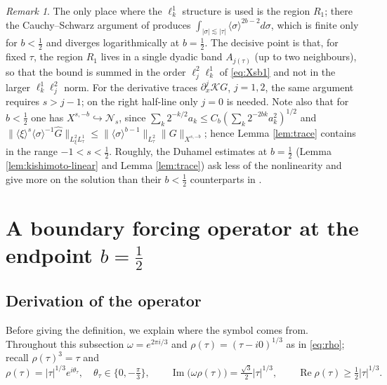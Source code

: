 \documentclass[10pt,reqno]{amsart}
\newcommand{\new}[1]{#1}
\theoremstyle{remark}
\newtheorem{remark}[theorem]{Remark}
\numberwithin{equation}{section}
\newcommand{\om}{\omega}
\newcommand{\pd}{\partial}
\newcommand{\re}{\operatorname{Re}}
\newcommand{\ima}{\operatorname{Im}}
\newcommand{\lan}{\langle}
\newcommand{\ran}{\rangle}
\newcommand{\Kc}{\mathcal{K}}
\newcommand{\sig}{\sigma}
\begin{document}
\begin{remark}
The only place where the $\ell^1_k$ structure is used is the region $R_1$; there the Cauchy--Schwarz argument of \cite{Holmer} produces $\int_{|\sig|\lesssim|\tau|}\lan\sig\ran^{2b-2}d\sig$, which is finite only for $b<\frac12$ and diverges logarithmically at $b=\frac12$. The decisive point is that, for fixed $\tau$, the region $R_1$ lives in a single dyadic band $A_{j(\tau)}$ (up to two neighbours), so that the bound is summed in the order $\ell^2_j\ell^1_k$ of \eqref{eq:Xsb1} and not in the larger $\ell^1_k\ell^2_j$ norm. For the derivative traces $\pd_x^j\Kc G$, $j=1,2$, the same argument requires $s>j-1$; on the right half-line only $j=0$ is needed. \new{Note also that for $b<\frac12$ one has $X^{s,-b}\hookrightarrow\mathcal N_s$, since $\sum_k2^{-k/2}a_k\le C_b(\sum_k2^{-2bk}a_k^2)^{1/2}$ and $\|\lan\xi\ran^s\lan\sig\ran^{-1}\widehat G\|_{L^2_\xi L^1_\tau}\le\|\lan\sig\ran^{b-1}\|_{L^2_\tau}\|G\|_{X^{s,-b}}$; hence Lemma \ref{lem:trace} contains \cite[Lemma 5.6(b)]{Holmer} in the range $-1<s<\frac12$. Roughly, the Duhamel estimates at $b=\frac12$ (Lemma \ref{lem:kishimoto-linear} and Lemma \ref{lem:trace}) ask less of the nonlinearity and give more on the solution than their $b<\frac12$ counterparts in \cite{Holmer}.}
\end{remark}

\section{A boundary forcing operator at the endpoint $b=\frac12$}\label{sec:L}

\subsection{Derivation of the operator}\label{sec:derivation}
Before giving the definition, we explain where the symbol comes from. Throughout this subsection $\om=e^{2\pi i/3}$ and $\rho(\tau)=(\tau-i0)^{1/3}$ as in \eqref{eq:rho}; recall $\rho(\tau)^3=\tau$ and
\begin{equation}\label{eq:rho-props}
\rho(\tau)=|\tau|^{1/3}e^{i\theta_\tau},\quad \theta_\tau\in\{0,-\tfrac\pi3\},\qquad \ima\big(\om\rho(\tau)\big)=\tfrac{\sqrt3}2|\tau|^{1/3},\qquad \re\rho(\tau)\ge\tfrac12|\tau|^{1/3} .
\end{equation}
\end{document}
